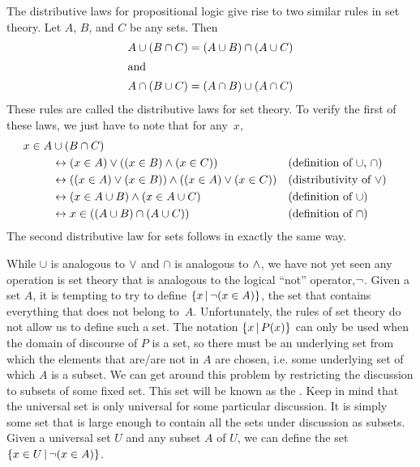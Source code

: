 The distributive laws for propositional logic give rise to two
similar rules in set theory.  Let $A$, $B$, and $C$ be any sets.
Then
\begin{align*}
A\cup(B\cap C)&=(A\cup B)\cap(A\cup C)\\
\intertext{and}
A\cap(B\cup C)&=(A\cap B)\cup(A\cap C)
\end{align*}
These rules are called the distributive laws for
set theory.  To verify the first of these laws, we just have to
note that for any~$x$,
\begin{align*}
x\in A&\cup(B\cap C) \\
                    &\leftrightarrow (x\in A)\vee((x\in B)\wedge (x\in C))  
                              &&\text{(definition of $\cup$, $\cap$)}\\
                    &\leftrightarrow ((x\in A)\vee(x\in B)) \wedge((x \in A)\vee (x\in C))
                              &&\text{(distributivity of $\vee$)}\\
                    &\leftrightarrow (x\in A\cup B) \wedge (x \in A\cup C)
                              &&\text{(definition of $\cup$)}\\
                    &\leftrightarrow x\in ((A\cup B)\cap(A\cup C))
                              &&\text{(definition of $\cap$)}
\end{align*}
The second distributive law for sets follows in exactly the
same way.

\medbreak

While $\cup$ is analogous to $\vee$ and $\cap$ is analogous to
$\wedge$, we have not yet seen any operation is set theory that
is analogous to the logical ``not'' operator,$\lnot$.  Given a
set $A$, it is tempting to try to define $\{x\,|\, \lnot(x\in A)\}$,
the set that contains everything that does not belong to~$A$. 
Unfortunately, the rules of set theory do not allow us to define 
such a set.  The notation $\{x\,|\, P(x)\}$ can only be used when
the domain of discourse of $P$ is a set, so there must be an underlying
set from which the elements that are/are not in $A$ are chosen,
i.e. some underlying set of which $A$ is a subset.  We can get around
this problem by restricting the discussion to subsets of
some fixed set.  This set will be known as the .
Keep in mind that the universal set is only universal for some
particular discussion.  It is simply some set that is large 
enough to contain all the sets under discussion as subsets.
Given a universal set $U$ and any subset $A$ of $U$,
we can define the set $\{x\in U\,|\, \lnot(x\in A)\}$.

